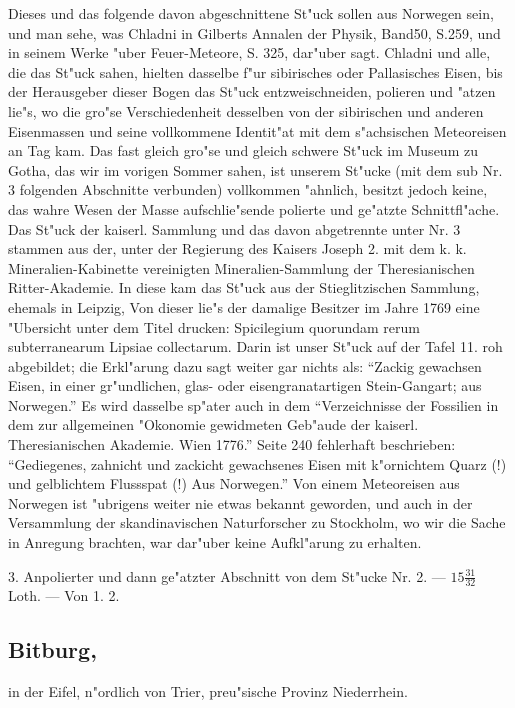 \documentclass[a4paper, 11pt, oneside, polutonikogreek, german]{article}
\begin{document}
{\footnotesize Dieses und das folgende davon abgeschnittene St"uck sollen aus Norwegen sein, und man sehe, was Chladni in Gilberts Annalen der Physik, Band50, S.259, und in seinem Werke "uber Feuer-Meteore, S. 325, dar"uber sagt. Chladni und alle, die das St"uck sahen, hielten dasselbe f"ur sibirisches oder Pallasisches Eisen, bis der Herausgeber dieser Bogen das St"uck entzweischneiden, polieren und "atzen lie"s, wo die gro"se Verschiedenheit desselben von der sibirischen und anderen Eisenmassen und seine vollkommene Identit"at mit dem s"achsischen Meteoreisen an Tag kam. Das fast gleich gro"se und gleich schwere St"uck im Museum zu Gotha, das wir im vorigen Sommer sahen, ist unserem St"ucke (mit dem sub Nr. 3 folgenden Abschnitte verbunden) vollkommen "ahnlich, besitzt jedoch keine, das wahre Wesen der Masse aufschlie"sende polierte und ge"atzte Schnittfl"ache. Das St"uck der kaiserl. Sammlung und das davon abgetrennte unter Nr. 3 stammen aus der, unter der Regierung des Kaisers Joseph 2. mit dem k. k. Mineralien-Kabinette vereinigten Mineralien-Sammlung der Theresianischen Ritter-Akademie. In diese kam das St"uck aus der Stieglitzischen Sammlung, ehemals in Leipzig, Von dieser lie"s der damalige Besitzer im Jahre 1769 eine "Ubersicht unter dem Titel drucken: Spicilegium quorundam rerum subterranearum Lipsiae collectarum. Darin ist unser St"uck auf der Tafel 11. roh abgebildet; die Erkl"arung dazu sagt weiter gar nichts als: "`Zackig gewachsen Eisen, in einer gr"undlichen, glas- oder eisengranatartigen Stein-Gangart; aus Norwegen."' Es wird dasselbe sp"ater auch in dem "`Verzeichnisse der Fossilien in dem zur allgemeinen "Okonomie gewidmeten Geb"aude der kaiserl. Theresianischen Akademie. Wien 1776."' Seite 240 fehlerhaft beschrieben: "`Gediegenes, zahnicht und zackicht gewachsenes Eisen mit k"ornichtem Quarz (!) und gelblichtem Flussspat (!) Aus Norwegen."' Von einem Meteoreisen aus Norwegen ist "ubrigens weiter nie etwas bekannt geworden, und auch in der Versammlung der skandinavischen Naturforscher zu Stockholm, wo wir die Sache in Anregung brachten, war dar"uber keine Aufkl"arung zu erhalten.}

\setlength{\leftskip}{0pt}
\setlength{\parindent}{20pt}

3. Anpolierter und dann ge"atzter Abschnitt von dem St"ucke Nr. 2. --- $15\frac{31}{32}$ Loth. --- Von 1. 2.
\subsection[Bitburg.]{Bitburg,}
\begin{center}
\small
in der Eifel, n"ordlich von Trier, preu"sische Provinz Niederrhein.
\end{center}
\end{document}
